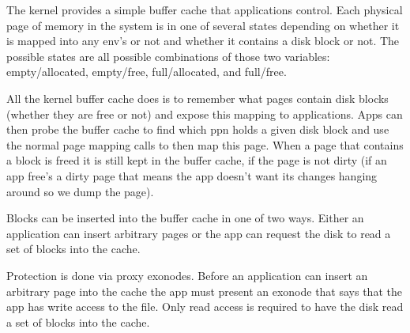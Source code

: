 
\label{sec:bc}

The kernel provides a simple buffer cache that applications control.
Each physical page of memory in the system is in one of several states
depending on whether it is mapped into any env's or not and whether it
contains a disk block or not. The possible states are all possible
combinations of those two variables: empty/allocated, empty/free,
full/allocated, and full/free.

All the kernel buffer cache does is to remember what pages contain
disk blocks (whether they are free or not) and expose this mapping to
applications.  Apps can then probe the buffer cache to find which ppn
holds a given disk block and use the normal page mapping calls to then
map this page. When a page that contains a block is freed it is still
kept in the buffer cache, if the page is not dirty (if an app free's a
dirty page that means the app doesn't want its changes hanging around
so we dump the page).

Blocks can be inserted into the buffer cache in one of two
ways. Either an application can insert arbitrary pages or the app can
request the disk to read a set of blocks into the cache.

Protection is done via proxy exonodes. Before an application can
insert an arbitrary page into the cache the app must present an
exonode that says that the app has write access to the file. Only read
access is required to have the disk read a set of blocks into the
cache.

